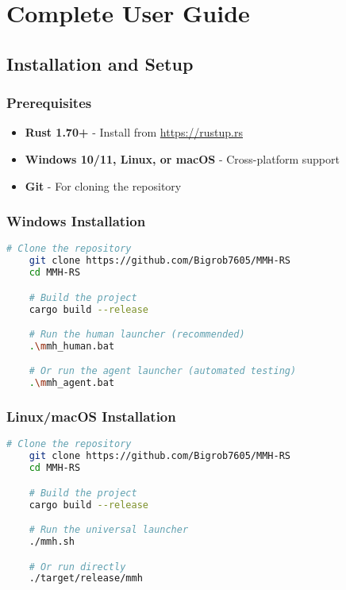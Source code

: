 \documentclass[11pt,a4paper]{article}
\begin{document}
	\tableofcontents
	\newpage

	\section{Complete User Guide}
	\label{sec:userguide}

	\subsection{Installation and Setup}

	\subsubsection{Prerequisites}
	\begin{itemize}
		\item \textbf{Rust 1.70+} - Install from \url{https://rustup.rs}
		\item \textbf{Windows 10/11, Linux, or macOS} - Cross-platform support
		\item \textbf{Git} - For cloning the repository
	\end{itemize}

	\subsubsection{Windows Installation}
	\begin{lstlisting}[language=bash]
	# Clone the repository
	git clone https://github.com/Bigrob7605/MMH-RS
	cd MMH-RS

	# Build the project
	cargo build --release

	# Run the human launcher (recommended)
	.\mmh_human.bat

	# Or run the agent launcher (automated testing)
	.\mmh_agent.bat
	\end{lstlisting}

	\subsubsection{Linux/macOS Installation}
	\begin{lstlisting}[language=bash]
	# Clone the repository
	git clone https://github.com/Bigrob7605/MMH-RS
	cd MMH-RS

	# Build the project
	cargo build --release

	# Run the universal launcher
	./mmh.sh

	# Or run directly
	./target/release/mmh
	\end{lstlisting}
\end{document}
